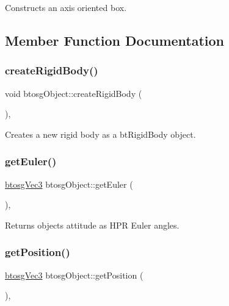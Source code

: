 Constructs an axis oriented box. 

\subsection{Member Function Documentation}
\mbox{\label{classbtosgObject_a029dbe9134fa94e7355799f67fb2cd6d}} 
\subsubsection{\texorpdfstring{create\+Rigid\+Body()}{createRigidBody()}}
{\footnotesize\ttfamily void btosg\+Object\+::create\+Rigid\+Body (\begin{DoxyParamCaption}{ }\end{DoxyParamCaption})\hspace{0.3cm}{\ttfamily [inline]}, {\ttfamily [inherited]}}

Creates a new rigid body as a bt\+Rigid\+Body object. \mbox{\label{classbtosgObject_a2019ec63bde02b72600450c7c985e77a}} 
\subsubsection{\texorpdfstring{get\+Euler()}{getEuler()}}
{\footnotesize\ttfamily \hyperlink{classbtosgVec3}{btosg\+Vec3} btosg\+Object\+::get\+Euler (\begin{DoxyParamCaption}{ }\end{DoxyParamCaption})\hspace{0.3cm}{\ttfamily [inline]}, {\ttfamily [inherited]}}

Returns object\textquotesingle{}s attitude as H\+PR Euler angles. \mbox{\label{classbtosgObject_a3dadd5da8f2a312e44a039446b93d4cd}} 
\subsubsection{\texorpdfstring{get\+Position()}{getPosition()}}
{\footnotesize\ttfamily \hyperlink{classbtosgVec3}{btosg\+Vec3} btosg\+Object\+::get\+Position (\begin{DoxyParamCaption}{ }\end{DoxyParamCaption})\hspace{0.3cm}{\ttfamily [inline]}, {\ttfamily [inherited]}}

